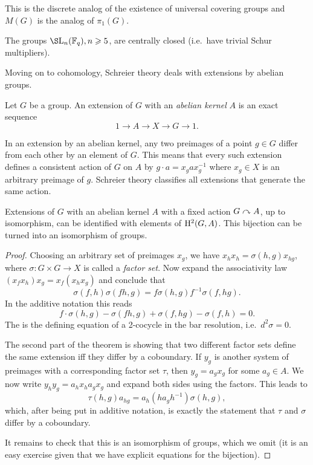 This is the discrete analog of the existence of universal covering groups and $M(G)$ is the analog of $\pi_1(G)$.

\begin{thm}[Schur]
    The groups $\S\rmL_n(\bbF_q),n\geq 5$, are centrally closed (i.e.~have trivial Schur multipliers).
\end{thm}

Moving on to cohomology, Schreier theory deals with extensions by abelian groups.

\begin{defn}
    Let $G$ be a group. An extension of $G$ with an \emph{abelian kernel} $A$ is an exact sequence
    \[1\to A\to X\to G\to 1.\]
\end{defn}

In an extension by an abelian kernel, any two preimages of a point $g\in G$ differ from each other by an element of $G$. This means that every such extension defines a consistent action of $G$ on $A$ by $g\cdot a=x_g ax_g^{-1}$ where $x_g\in X$ is an arbitrary preimage of $g$. Schreier theory classifies all extensions that generate the same action.

\begin{thm}[Schreier]
    Extensions of $G$ with an abelian kernel $A$ with a fixed action $G\curvearrowright A$, up to isomorphism, can be identified with elements of $\mathrm{H}^2(G,A)$. This bijection can be turned into an isomorphism of groups.
\end{thm}
\begin{proof}
    Choosing an arbitrary set of preimages $x_g$, we have $x_hx_h=\sigma(h,g)x_{hg}$, where $\sigma:G\times G\to X$ is called a \emph{factor set}. Now expand the associativity law $(x_fx_h)x_g=x_f(x_hx_g)$ and conclude that 
    \[\sigma(f,h)\sigma(fh,g)=f\sigma(h,g)f^{-1}\sigma(f,hg).\]
    In the additive notation this reads
    \[f\cdot\sigma(h,g)-\sigma(fh,g)+\sigma(f,hg)-\sigma(f,h)=0.\]
    The is the defining equation of a 2-cocycle in the bar resolution, i.e.~$d^2\sigma=0$.

    The second part of the theorem is showing that two different factor sets define the same extension iff they differ by a coboundary. If $y_g$ is another system of preimages with a corresponding factor set $\tau$, then $y_g=a_gx_g$ for some $a_g\in A$. We now write $y_hy_g=a_hx_ha_gx_g$ and expand both sides using the factors. This leads to
    \[\tau(h,g)a_{hg}=a_h (ha_gh^{-1})\sigma(h,g),\]
    which, after being put in additive notation, is exactly the statement that $\tau$ and $\sigma$ differ by a coboundary.

    It remains to check that this is an isomorphism of groups, which we omit (it is an easy exercise given that we have explicit equations for the bijection).
\end{proof}

